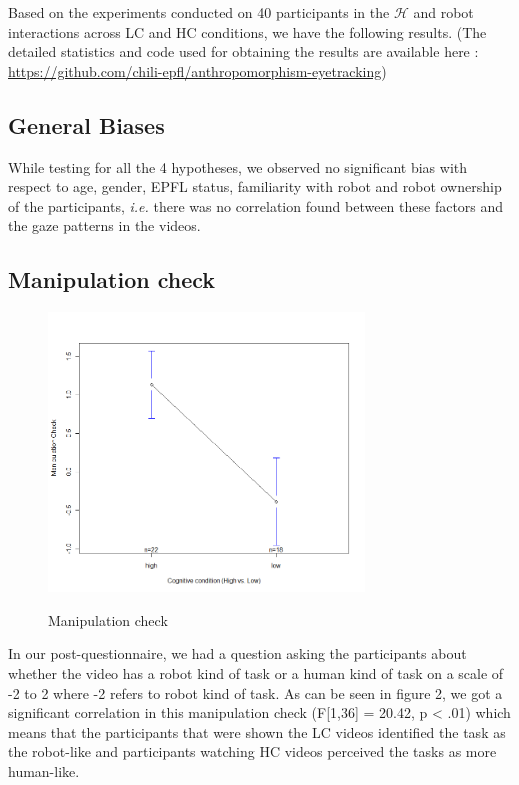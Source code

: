 \documentclass[a4,twocolumn,10pt]{article}
\newcommand{\ie}{\textit{i.e.}\xspace}
\begin{document}
Based on the experiments conducted on 40 participants in the $\mathcal{H}$ and
robot interactions across LC and HC conditions, we have the following
results. (The detailed statistics and code used for obtaining the results are
available here : \url{https://github.com/chili-epfl/anthropomorphism-eyetracking})

\subsection{General Biases}

While testing for all the 4 hypotheses, we observed no significant bias with
respect to age, gender, EPFL status, familiarity with robot and robot ownership
of the participants, \ie there was no correlation found between these factors
and the gaze patterns in the videos.

\subsection{Manipulation check}

\begin{figure}
    {\includegraphics[width=3.3in]{ManipulationCheck}}
    \caption{Manipulation check}
    \label{fig:ManipulationCheck}
\end{figure}


In our post-questionnaire, we had a question asking the participants about
whether the video has a robot kind of task or a human kind of task on a scale of
-2 to 2 where -2 refers to robot kind of task. As can be seen in figure 2, we
got a significant correlation in this manipulation check (F[1,36] = 20.42, p <
.01) which means that the participants that were shown the LC videos identified
the task as the robot-like and participants watching HC videos perceived the
tasks as more human-like. 
\end{document}
